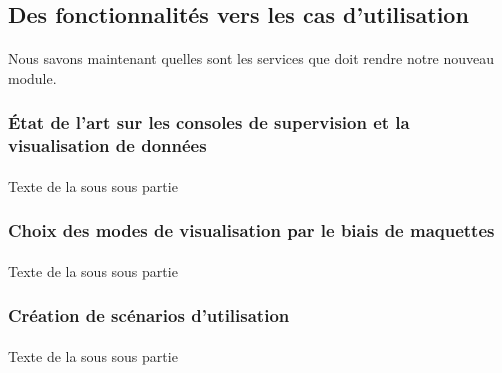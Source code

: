 	\subsection{Des fonctionnalités vers les cas d'utilisation}
		\paragraph{}
		Nous savons maintenant quelles sont les services que doit rendre notre nouveau
		module.
		
		\subsubsection{État de l'art sur les consoles de supervision et la visualisation de données}
			\paragraph{}
			Texte de la sous sous partie
		\subsubsection{Choix des modes de visualisation par le biais de maquettes}
			\paragraph{}
			Texte de la sous sous partie
		\subsubsection{Création de scénarios d'utilisation}
			\paragraph{}
			Texte de la sous sous partie
